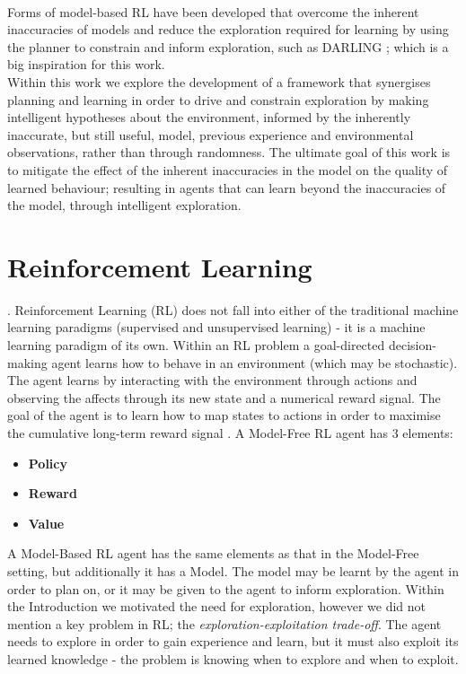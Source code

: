 \\Forms of model-based RL have been developed that overcome the inherent inaccuracies of models and reduce the exploration required for learning by using the planner to constrain and inform exploration, such as DARLING \cite{AIJ16-leonetti}; which is a big inspiration for this work.
\\Within this work we explore the development of a framework that synergises planning and learning in order to drive and constrain exploration by making intelligent hypotheses about the environment, informed by the inherently inaccurate, but still useful, model, previous experience and environmental observations, rather than through randomness. The ultimate goal of this work is to mitigate the effect of the inherent inaccuracies in the model on the quality of learned behaviour; resulting in agents that can learn beyond the inaccuracies of the model, through intelligent exploration.


\section{Reinforcement Learning}.
Reinforcement Learning (RL) does not fall into either of the traditional machine learning paradigms (supervised and unsupervised learning) - it is a machine learning paradigm of its own. Within an RL problem a goal-directed decision-making agent learns how to behave in an environment (which may be stochastic). The agent learns by interacting with the environment through actions and observing the affects through its new state and a numerical reward signal. The goal of the agent is to learn how to map states to actions in order to maximise the cumulative long-term reward signal \cite{DBLP:books/lib/SuttonB98}.
A Model-Free RL agent has 3 elements:
\begin{itemize}
    \item \textbf{Policy}
    \item \textbf{Reward}
    \item \textbf{Value}
\end{itemize}
A Model-Based RL agent has the same elements as that in the Model-Free setting, but additionally it has a Model. The model may be learnt by the agent in order to plan on, or it may be given to the agent to inform exploration.
Within the Introduction we motivated the need for exploration, however we did not mention a key problem in RL; the \textit{exploration-exploitation trade-off}. The agent needs to explore in order to gain experience and learn, but it must also exploit its learned knowledge - the problem is knowing when to explore and when to exploit.
